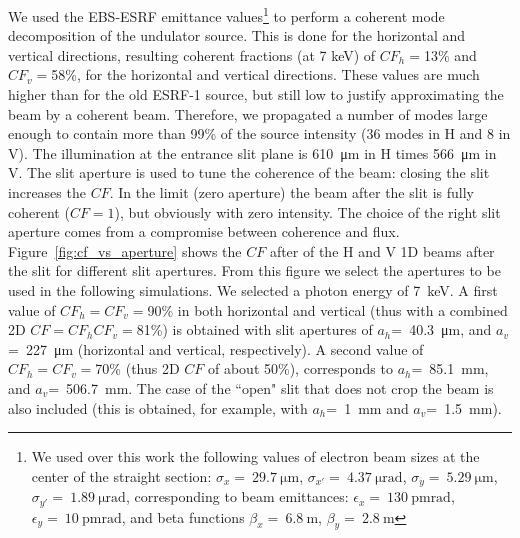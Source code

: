 \documentclass{iucr}              %
\begin{document}
We used the EBS-ESRF emittance values\footnote{We used over this work the following values of electron beam sizes at the center of the straight section: $\sigma_x=~\SI{29.7}{\micro\meter}$,
$\sigma_{x'}=~\SI{4.37}{\micro\radian}$,
$\sigma_y=~\SI{5.29}{\micro\meter}$,
$\sigma_{y'}=~\SI{1.89}{\micro\radian}$, corresponding to beam emittances:  $\epsilon_x=~\SI{130}{\pico\meter \radian}$,
$\epsilon_y=~\SI{10}{\pico\meter \radian}$, and beta functions
$\beta_x=~\SI{6.8}{\meter}$,
$\beta_y=~\SI{2.8}{\meter}$
}
to perform a coherent mode decomposition of the undulator source.
This is done for the horizontal and vertical directions, resulting coherent fractions (at 7 keV) of $CF_h=$13\% and $CF_v=$58\%, for the horizontal and vertical directions. These values are much higher than for the old ESRF-1 source, but still low to justify approximating the beam by a coherent beam. Therefore, we propagated a number of modes large enough to contain more than 99\% of the source intensity (36 modes in H and 8 in V). The illumination at the entrance slit plane is \SI{610}{\micro\meter} in H times \SI{566}{\micro\meter} in V. The slit aperture is used to tune the coherence of the beam: closing the slit increases the $CF$. In the limit (zero aperture) the beam after the slit is fully coherent ($CF=1$), but obviously with zero intensity. The choice of the right slit aperture comes from a compromise between coherence and flux. Figure~\ref{fig:cf_vs_aperture} shows the $CF$ after of the H and V 1D beams after the slit for different slit apertures. From this figure we select the apertures to be used in the following simulations. We selected a photon energy of \SI{7}{keV}. A first value of $CF_h=CF_v=$90\% in both horizontal and vertical (thus with a combined 2D  $CF=CF_h CF_v=$81\%) is obtained with slit apertures of
$a_h$=~\SI{40.3}{\micro\meter}, and 
$a_v$=~\SI{227}{\micro\meter} (horizontal and vertical, respectively). A second value of  $CF_h=CF_v=$70\% (thus 2D $CF$ of about 50\%), corresponds to 
$a_h$=~\SI{85.1}{\milli\meter}, and 
$a_v$=~\SI{506.7}{\milli\meter}. The case of the ``open" slit that does not crop the beam is also included (this is obtained, for example, with $a_h$=~\SI{1}{\milli\meter} and $a_v$=~\SI{1.5}{\milli\meter}).
\end{document}
